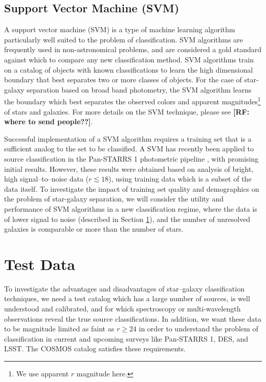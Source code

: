 \documentclass[12pt,preprint]{aastex}
\newcommand\rf[1]{{\bf [RF: #1]}}
\begin{document}
\subsection{Support Vector Machine (SVM)}
\label{ssec:SVMmethod}

A support vector machine (SVM) is a type of machine learning algorithm
particularly well suited to the problem of classification.  SVM
algorithms are frequently used in non-astronomical problems, and are
considered a gold standard against which to compare any new
classification method.  SVM algorithms train on a catalog of objects
with known classifications to learn the high dimensional boundary that
best separates two or more classes of objects.
For the case of star-galaxy separation based on broad band photometry,
the SVM algorithm learns the boundary which best separates the
observed colors and apparent magnitudes\footnote{We use apparent $r$
  magnitude here.} of stars and galaxies.  For more details on the SVM 
  technique, please see \rf{where to send people??}.

Successful implementation of a SVM algorithm requires a training set
that is a sufficient analog to the set to be classified.  A SVM has
recently been applied to source classification in the Pan-STARRS 1
photometric pipeline \citep{saglia12}, with promising initial
results. However, these results were obtained based on analysis of 
bright, high signal--to--noise data ($r\lesssim18$), using training data 
which is a subset of the data itself.
To investigate the impact of training set quality and demographics on
the problem of star-galaxy separation, we will consider the utility
and performance of SVM algorithms in a new classification regime,
where the data is of lower signal to noise (described in Section
\ref{sec:data}), and the number of unresolved galaxies is comparable
or more than the number of stars.

\section{Test Data}
\label{sec:data}

To investigate the advantages and disadvantages of star--galaxy
classification techniques, we need a test catalog which has a large
number of sources, is well understood and calibrated, and for
which spectroscopy or multi-wavelength observations reveal the true
source classifications.  In addition, we want these data to be
magnitude limited as faint as $r\ge24$ in order to understand the
problem of classification in current and upcoming surveys like
Pan-STARRS 1, DES, and LSST.  The COSMOS catalog satisfies these
requirements.   
\end{document}
